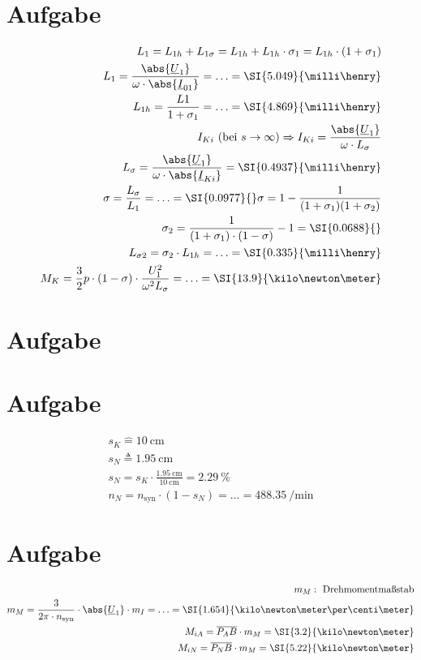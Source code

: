 \documentclass[10pt,a4paper]{article}
\begin{document}
\section{Aufgabe}
\begin{align*}
L_1 = L_{1h} + L_{1\sigma} = L_{1h} + L_{1h} \cdot \sigma_1 = L_{1h} \cdot (1 + \sigma_1)\\
L_1 = \frac{\abs{\underline U_1}}{\omega \cdot \abs{\underline I_{01}}} = \ldots = \SI{5.049}{\milli\henry}\\
L_{1h} = \frac{L1}{1 + \sigma_1} = \ldots = \SI{4.869}{\milli\henry}\\
I_{Ki}\ (\text{bei } s\rightarrow\infty) \Rightarrow I_{Ki} = \frac{\abs{\underline{U}_1}}{\omega \cdot L_\sigma}\\
L_\sigma = \frac{\abs{\underline U_1}}{\omega \cdot \abs{\underline I_{Ki}}} = \SI{0.4937}{\milli\henry}\\
\sigma = \frac{L_\sigma}{L_1} = \ldots = \SI{0.0977}{}
\sigma = 1 - \frac{1}{(1+\sigma_1)(1+\sigma_2)}\\
\sigma_2 = \frac{1}{(1+\sigma_1)\cdot (1-\sigma)} -1 = \SI{0.0688}{}\\
L_{\sigma 2} = \sigma_2 \cdot L_{1h} = \ldots = \SI{0.335}{\milli\henry}\\
M_K = \frac{3}{2}p \cdot (1-\sigma) \cdot \frac{U_1^2}{\omega^{2} L_\sigma} = \ldots = \SI{13.9}{\kilo\newton\meter}
\end{align*}

\section{Aufgabe}

\section{Aufgabe}
\begin{align*}
s_K \hat{=} \SI{10}{\centi\metre}\\
s_N \triangleq \SI{1.95}{\centi\meter}\\
s_N = s_K \cdot \frac{\SI{1.95}{\centi\meter}}{\SI{10}{\centi\meter}} = \SI{2.29}{\percent}\\
n_N = n_\text{syn} \cdot (1 - s_N) = \ldots = \SI{488.35}{\per\minute}
\end{align*}

\section{Aufgabe}
\begin{align*}
m_M:\ \text{Drehmomentmaßstab}\\
m_M = \frac{3}{2\pi \cdot n_\text{syn}} \cdot \abs{\underline{U}_1} \cdot m_I = \ldots = \SI{1.654}{\kilo\newton\meter\per\centi\meter}\\
M_{iA} = \overline{P_AB} \cdot m_M = \SI{3.2}{\kilo\newton\meter}\\
M_{iN} = \overline{P_NB} \cdot m_M = \SI{5.22}{\kilo\newton\meter}
\end{align*}
\end{document}
